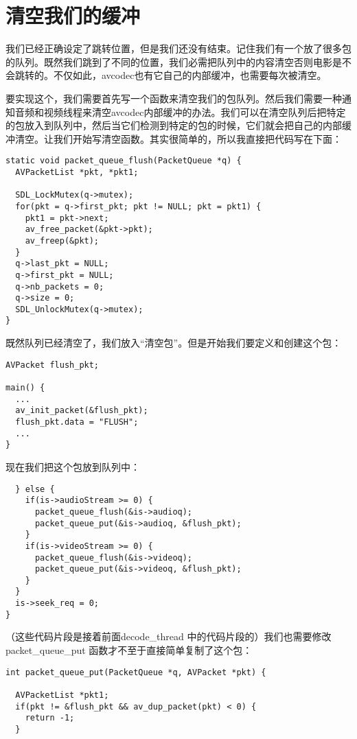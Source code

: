 \section{清空我们的缓冲}

我们已经正确设定了跳转位置，但是我们还没有结束。记住我们有一个放了很多包的队列。既然我们跳到了不同的位置，我们必需把队列中的内容清空否则电影是不会跳转的。不仅如此，avcodec也有它自己的内部缓冲，也需要每次被清空。

要实现这个，我们需要首先写一个函数来清空我们的包队列。然后我们需要一种通知音频和视频线程来清空avcodec内部缓冲的办法。我们可以在清空队列后把特定的包放入到队列中，然后当它们检测到特定的包的时候，它们就会把自己的内部缓冲清空。让我们开始写清空函数。其实很简单的，所以我直接把代码写在下面：
\begin{lstlisting}
static void packet_queue_flush(PacketQueue *q) {
  AVPacketList *pkt, *pkt1;

  SDL_LockMutex(q->mutex);
  for(pkt = q->first_pkt; pkt != NULL; pkt = pkt1) {
    pkt1 = pkt->next;
    av_free_packet(&pkt->pkt);
    av_freep(&pkt);
  }
  q->last_pkt = NULL;
  q->first_pkt = NULL;
  q->nb_packets = 0;
  q->size = 0;
  SDL_UnlockMutex(q->mutex);
}
\end{lstlisting}

既然队列已经清空了，我们放入“清空包”。但是开始我们要定义和创建这个包：

\begin{lstlisting}
AVPacket flush_pkt;

main() {
  ...
  av_init_packet(&flush_pkt);
  flush_pkt.data = "FLUSH";
  ...
}
\end{lstlisting}

现在我们把这个包放到队列中：

\begin{lstlisting}
  } else {
    if(is->audioStream >= 0) {
      packet_queue_flush(&is->audioq);
      packet_queue_put(&is->audioq, &flush_pkt);
    }
    if(is->videoStream >= 0) {
      packet_queue_flush(&is->videoq);
      packet_queue_put(&is->videoq, &flush_pkt);
    }
  }
  is->seek_req = 0;
}
\end{lstlisting}

（这些代码片段是接着前面decode_thread 中的代码片段的）我们也需要修改packet_queue_put 函数才不至于直接简单复制了这个包：

\begin{lstlisting}
int packet_queue_put(PacketQueue *q, AVPacket *pkt) {

  AVPacketList *pkt1;
  if(pkt != &flush_pkt && av_dup_packet(pkt) < 0) {
    return -1;
  }
\end{lstlisting}

